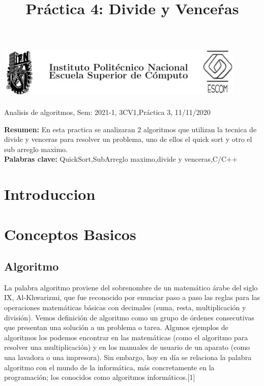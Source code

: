 \documentclass[spanish]{article}
\title {Práctica 4: Divide y Venceŕas}
\begin{document}
	\centerline{\includegraphics[width=450px,height=100px]{header}}
	\centerline{Analisis de algoritmos, Sem: 2021-1, 3CV1,Práctica  3, 11/11/2020}
	\centerline{}
	\bigskip
	\justify
	\textbf{Resumen:}	
	En esta practica se analizaran 2 algoritmos que utilizan la tecnica de divide y venceras para resolver un problema, uno de ellos el quick sort y otro el sub arreglo maximo.\\
	\textbf{Palabras clave:}
	QuickSort,SubArreglo maximo,divide y venceras,C/C++
	\section{Introduccion}
	
	\section{Conceptos Basicos}
	\subsection{Algoritmo}
	La palabra algoritmo proviene del sobrenombre de un matemático árabe del siglo IX, Al-Khwarizmi, que fue reconocido por enunciar paso a paso las reglas para las operaciones matemáticas básicas con decimales (suma, resta, multiplicación y división).	
	Vemos definición de algoritmo como un grupo de órdenes consecutivas que presentan una solución a un problema o tarea. Algunos ejemplos de algoritmos los podemos encontrar en las matemáticas (como el algoritmo para resolver una multiplicación) y en los manuales de usuario de un aparato (como una lavadora o una impresora).	
	Sin embargo, hoy en día se relaciona la palabra algoritmo con el mundo de la informática, más concretamente en la programación; los conocidos como algoritmos informáticos.[1]
\end{document}
